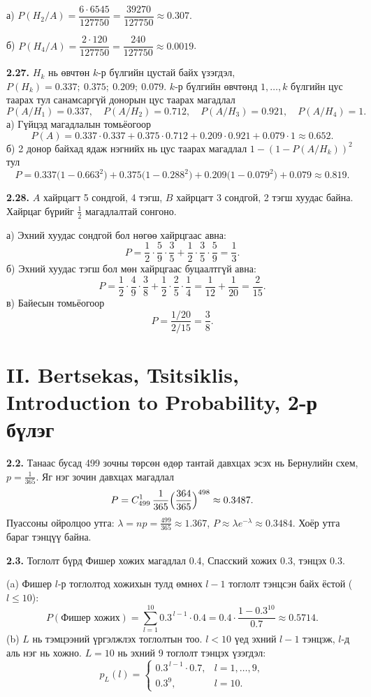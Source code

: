 \documentclass[11pt,a4paper]{article}
\newcommand{\bod}[1]{\par\medskip\noindent\textbf{#1}\quad}
\begin{document}
а) $P(H_2/A)=\dfrac{6\cdot6545}{127750}=\dfrac{39270}{127750}\approx0.307$.

б) $P(H_4/A)=\dfrac{2\cdot120}{127750}=\dfrac{240}{127750}\approx0.0019$.

\bod{2.27.}
$H_k$ нь өвчтөн $k$-р бүлгийн цустай байх үзэгдэл, $P(H_k)=0.337;\ 0.375;\ 0.209;\ 0.079$. $k$-р бүлгийн өвчтөнд $1,\dots,k$ бүлгийн цус таарах тул санамсаргүй донорын цус таарах магадлал
\[
P(A/H_1)=0.337,\quad P(A/H_2)=0.712,\quad P(A/H_3)=0.921,\quad P(A/H_4)=1 .
\]
а) Гүйцэд магадлалын томьёогоор
\[
P(A)=0.337\cdot0.337+0.375\cdot0.712+0.209\cdot0.921+0.079\cdot1\approx0.652 .
\]
б) 2 донор байхад ядаж нэгнийх нь цус таарах магадлал $1-(1-P(A/H_k))^2$ тул
\[
P=0.337\bigl(1-0.663^2\bigr)+0.375\bigl(1-0.288^2\bigr)+0.209\bigl(1-0.079^2\bigr)+0.079\approx0.819 .
\]

\bod{2.28.}
$A$ хайрцагт 5 сондгой, 4 тэгш, $B$ хайрцагт 3 сондгой, 2 тэгш хуудас байна. Хайрцаг бүрийг $\frac12$ магадлалтай сонгоно.

а) Эхний хуудас сондгой бол нөгөө хайрцгаас авна:
\[
P=\frac12\cdot\frac59\cdot\frac35+\frac12\cdot\frac35\cdot\frac59=\frac13 .
\]
б) Эхний хуудас тэгш бол мөн хайрцгаас буцаалтгүй авна:
\[
P=\frac12\cdot\frac49\cdot\frac38+\frac12\cdot\frac25\cdot\frac14=\frac1{12}+\frac1{20}=\frac{2}{15}.
\]
в) Байесын томьёогоор
\[
P=\frac{1/20}{2/15}=\frac38 .
\]

\section*{II. Bertsekas, Tsitsiklis, Introduction to Probability, 2-р бүлэг}

\bod{2.2.}
Танаас бусад 499 зочны төрсөн өдөр тантай давхцах эсэх нь Бернулийн схем, $p=\frac1{365}$. Яг нэг зочин давхцах магадлал
\[
P=C_{499}^1\,\frac1{365}\Bigl(\frac{364}{365}\Bigr)^{498}\approx0.3487 .
\]
Пуассоны ойролцоо утга: $\lambda=np=\frac{499}{365}\approx1.367$, $P\approx\lambda e^{-\lambda}\approx0.3484$. Хоёр утга бараг тэнцүү байна.

\bod{2.3.}
Тоглолт бүрд Фишер хожих магадлал 0.4, Спасский хожих 0.3, тэнцэх 0.3.

(a) Фишер $l$-р тоглолтод хожихын тулд өмнөх $l-1$ тоглолт тэнцсэн байх ёстой ($l\le10$):
\[
P(\text{Фишер хожих})=\sum_{l=1}^{10}0.3^{\,l-1}\cdot0.4=0.4\cdot\frac{1-0.3^{10}}{0.7}\approx0.5714 .
\]
(b) $L$ нь тэмцээний үргэлжлэх тоглолтын тоо. $l<10$ үед эхний $l-1$ тэнцэж, $l$-д аль нэг нь хожно. $L=10$ нь эхний 9 тоглолт тэнцэх үзэгдэл:
\[
p_L(l)=\begin{cases}0.3^{\,l-1}\cdot0.7, & l=1,\dots,9,\\ 0.3^9, & l=10.\end{cases}
\]
\end{document}
